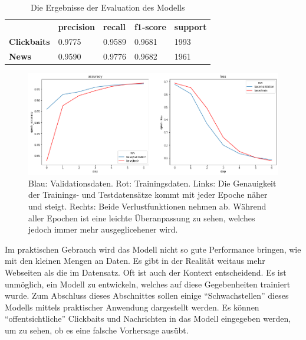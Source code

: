 \begin{table}[h]
    \caption{Die Ergebnisse der Evaluation des Modells}
    \label{eval1}
    \renewcommand{\arraystretch}{1.2}
    \centering
    \sffamily
    \begin{footnotesize}
        \begin{tabular}{l l l l l}
            \toprule
                           & \textbf{precision} & \textbf{recall} & \textbf{f1-score} & \textbf{support} \\
            \textbf{Clickbaits} & 0.9775                  & 0.9589                 & 0.9681                & 1993          \\
            \textbf{News}  & 0.9590                 & 0.9776                & 0.9682               & 1961                     \\
            \bottomrule
        \end{tabular}
    \end{footnotesize}
    \rmfamily
\end{table}

\begin{figure}[H]
    \centering
    \includegraphics[width=15cm]{kapitel5/basemodel.png}
    \caption[Vergleich der Genauigkeit mit dem Verlust]{Blau: Validationsdaten. Rot: Trainingsdaten. Links: Die Genauigkeit der Trainings- und Testdatensätze kommt mit jeder Epoche näher und steigt. Rechts: Beide Verlustfunktionen nehmen ab. Während aller Epochen ist eine leichte Überanpassung zu sehen, welches jedoch immer mehr ausgeglicehener wird.}
    \label{Kap5:Val}
\end{figure}



Im praktischen Gebrauch wird das Modell nicht so gute Performance bringen, wie mit den kleinen Mengen an Daten. Es gibt in der Realität weitaus mehr Webseiten als die im Datensatz. Oft ist auch der Kontext entscheidend. Es ist unmöglich, ein Modell zu entwickeln, welches auf diese Gegebenheiten trainiert wurde. Zum Abschluss dieses Abschnittes sollen einige \enquote{Schwachstellen} dieses Modells mittels praktischer Anwendung dargestellt werden. Es können \enquote{offentsichtliche} Clickbaits und Nachrichten in das Modell eingegeben werden, um zu sehen, ob es eine falsche Vorhersage ausübt.


